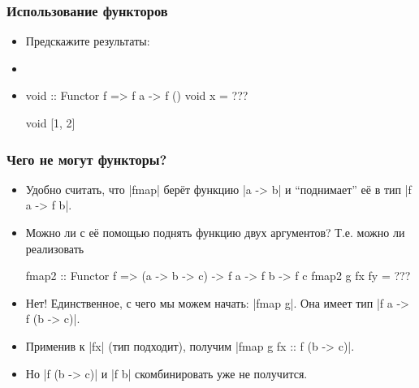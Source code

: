 \documentclass[11pt]{beamer}
\begin{document}
\begin{frame}[fragile]
  \frametitle{Использование функторов}
  \begin{itemize}
    \item Предскажите результаты:
          \pause
    \item[]
    \item
          \begin{haskell}
            void :: Functor f => f a -> f ()
            void x = ???

            void [1, 2]
          \end{haskell}
  \end{itemize}
\end{frame}

\begin{frame}[fragile]
  \frametitle{Чего не могут функторы?}
  \begin{itemize}
    \item Удобно считать, что \haskinline|fmap| берёт функцию \haskinline|a -> b| и \enquote{поднимает} её в тип \haskinline|f a -> f b|.
    \item Можно ли с её помощью поднять функцию двух аргументов? Т.е. можно ли реализовать
          \begin{haskellsmall}
            fmap2 :: Functor f => (a -> b -> c) -> f a -> f b -> f c
            fmap2 g fx fy = ???
          \end{haskellsmall}
          \pause
    \item Нет! Единственное, с чего мы можем начать: \pause \haskinline|fmap g|. Она имеет тип \pause \haskinline|f a -> f (b -> c)|.
    \item Применив к \haskinline|fx| (тип подходит), получим
          \haskinline|fmap g fx :: f (b -> c)|. \pause
    \item Но \haskinline|f (b -> c)| и  \haskinline|f b| скомбинировать уже не получится.
  \end{itemize}
\end{frame}
\end{document}
